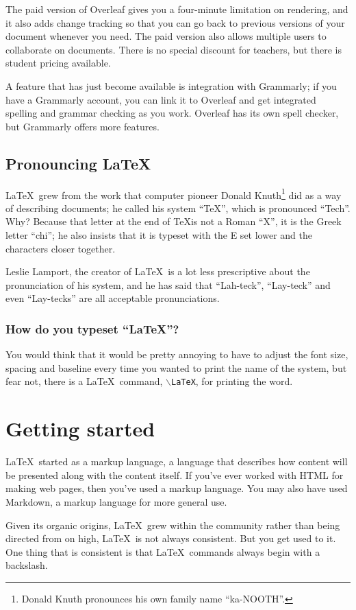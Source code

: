 \documentclass[12pt]{extarticle}
\begin{document}
The paid version of Overleaf gives you a four-minute limitation on rendering, and it also adds change tracking so that you can go back to previous versions of your document whenever you need. The paid version also allows multiple users to collaborate on documents. There is no special discount for teachers, but there is student pricing available.

A feature that has just become available is integration with Grammarly; if you have a Grammarly account, you can link it to Overleaf and get integrated spelling and grammar checking as you work. Overleaf has its own spell checker, but Grammarly offers more features.
\subsection{Pronouncing \LaTeX}
\LaTeX\ grew from the work that computer pioneer Donald Knuth\footnote{Donald Knuth pronounces his own family name ``ka-NOOTH''.} did as a way of describing documents; he called his system ``\TeX'', which is pronounced ``Tech''. Why? Because that letter at the end of \TeX \space is not a Roman ``X'', it is the Greek letter ``chi''; he also insists that it is typeset with the E set lower and the characters closer together.

Leslie Lamport, the creator of \LaTeX\ is a lot less prescriptive about the pronunciation of his system, and he has said that ``Lah-teck'', ``Lay-teck'' and even ``Lay-tecks'' are all acceptable pronunciations.
\subsubsection{How do you typeset ``\LaTeX''?}
You would think that it would be pretty annoying to have to adjust the font size, spacing and baseline every time you wanted to print the name of the system, but fear not, there is a \LaTeX\ command, \texttt{$\backslash$LaTeX}, for printing the word.
\section{Getting started}
\LaTeX\ started as a markup language, a language that describes how content will be presented along with the content itself. If you've ever worked with HTML for making web pages, then you've used a markup language. You may also have used Markdown, a markup language for more general use.

Given its organic origins, \LaTeX\ grew within the community rather than being directed from on high, \LaTeX\ is not always consistent. But you get used to it. One thing that is consistent is that \LaTeX\ commands always begin with a backslash.
\end{document}
